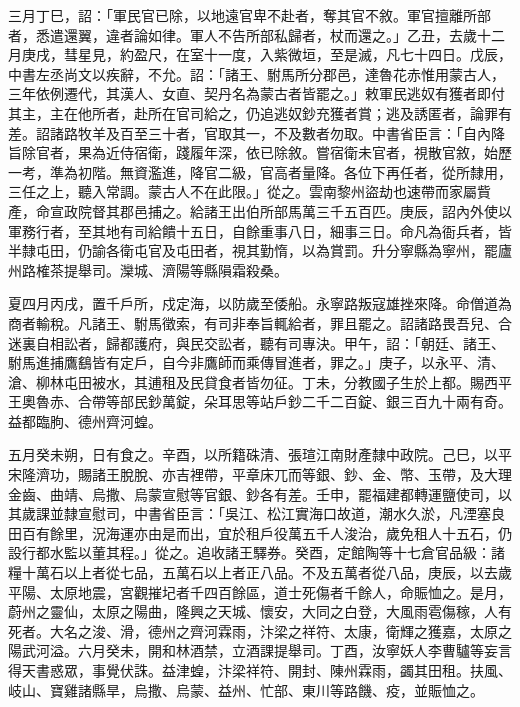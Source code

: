 \begin{pinyinscope}
 三月丁巳，詔：「軍民官已除，以地遠官卑不赴者，奪其官不敘。軍官擅離所部者，悉遣還翼，違者論如律。軍人不告所部私歸者，杖而還之。」乙丑，去歲十二月庚戌，彗星見，約盈尺，在室十一度，入紫微垣，至是滅，凡七十四日。戊辰，中書左丞尚文以疾辭，不允。詔：「諸王、駙馬所分郡邑，達魯花赤惟用蒙古人，三年依例遷代，其漢人、女直、契丹名為蒙古者皆罷之。」敕軍民逃奴有獲者即付其主，主在他所者，赴所在官司給之，仍追逃奴鈔充獲者賞；逃及誘匿者，論罪有差。詔諸路牧羊及百至三十者，官取其一，不及數者勿取。中書省臣言：「自內降旨除官者，果為近侍宿衛，踐履年深，依已除敘。嘗宿衛未官者，視散官敘，始歷一考，準為初階。無資濫進，降官二級，官高者量降。各位下再任者，從所隸用，三任之上，聽入常調。蒙古人不在此限。」從之。雲南黎州盜劫也速帶而家屬貲產，命宣政院督其郡邑捕之。給諸王出伯所部馬萬三千五百匹。庚辰，詔內外使以軍務行者，至其地有司給饋十五日，自餘重事八日，細事三日。命凡為衙兵者，皆半隸屯田，仍諭各衛屯官及屯田者，視其勤惰，以為賞罰。升分寧縣為寧州，罷廬州路榷茶提舉司。灤城、濟陽等縣隕霜殺桑。



 夏四月丙戌，置千戶所，戍定海，以防歲至倭船。永寧路叛寇雄挫來降。命僧道為商者輸稅。凡諸王、駙馬徵索，有司非奉旨輒給者，罪且罷之。詔諸路畏吾兒、合迷裏自相訟者，歸都護府，與民交訟者，聽有司專決。甲午，詔：「朝廷、諸王、駙馬進捕鷹鷂皆有定戶，自今非鷹師而乘傳冒進者，罪之。」庚子，以永平、清、滄、柳林屯田被水，其逋租及民貸食者皆勿征。丁未，分教國子生於上都。賜西平王奧魯赤、合帶等部民鈔萬錠，朵耳思等站戶鈔二千二百錠、銀三百九十兩有奇。益都臨朐、德州齊河蝗。



 五月癸未朔，日有食之。辛酉，以所籍硃清、張瑄江南財產隸中政院。己巳，以平宋隆濟功，賜諸王脫脫、亦吉裡帶，平章床兀而等銀、鈔、金、幣、玉帶，及大理金齒、曲靖、烏撒、烏蒙宣慰等官銀、鈔各有差。壬申，罷福建都轉運鹽使司，以其歲課並隸宣慰司，中書省臣言：「吳江、松江實海口故道，潮水久淤，凡湮塞良田百有餘里，況海運亦由是而出，宜於租戶役萬五千人浚治，歲免租人十五石，仍設行都水監以董其程。」從之。追收諸王驛券。癸酉，定館陶等十七倉官品級：諸糧十萬石以上者從七品，五萬石以上者正八品。不及五萬者從八品，庚辰，以去歲平陽、太原地震，宮觀摧圮者千四百餘區，道士死傷者千餘人，命賑恤之。是月，蔚州之靈仙，太原之陽曲，隆興之天城、懷安，大同之白登，大風雨雹傷稼，人有死者。大名之浚、滑，德州之齊河霖雨，汴梁之祥符、太康，衛輝之獲嘉，太原之陽武河溢。六月癸未，開和林酒禁，立酒課提舉司。丁酉，汝寧妖人李曹驢等妄言得天書惑眾，事覺伏誅。益津蝗，汴梁祥符、開封、陳州霖雨，蠲其田租。扶風、岐山、寶雞諸縣旱，烏撒、烏蒙、益州、忙部、東川等路饑、疫，並賑恤之。




\end{pinyinscope}
